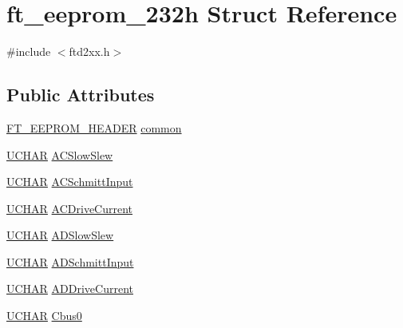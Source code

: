 \hypertarget{structft__eeprom__232h}{}\section{ft\+\_\+eeprom\+\_\+232h Struct Reference}
\label{structft__eeprom__232h}


{\ttfamily \#include $<$ftd2xx.\+h$>$}

\subsection*{Public Attributes}
\begin{DoxyCompactItemize}
\item 
\hyperlink{LALUsbMLx64_2include_2ftd2xx_8h_ad5a6f519cd67a403fd8742756462394e}{F\+T\+\_\+\+E\+E\+P\+R\+O\+M\+\_\+\+H\+E\+A\+D\+ER} \hyperlink{structft__eeprom__232h_a37234d2dd02343759c92fd97e4835ccb}{common}
\item 
\hyperlink{CatCaloProto40MHz_2inc_2WinTypes_8h_a4f4bb67531a9bf6f0b9c6ad76aeba587}{U\+C\+H\+AR} \hyperlink{structft__eeprom__232h_a3cfbbe62de0029839534fb469a9b50c9}{A\+C\+Slow\+Slew}
\item 
\hyperlink{CatCaloProto40MHz_2inc_2WinTypes_8h_a4f4bb67531a9bf6f0b9c6ad76aeba587}{U\+C\+H\+AR} \hyperlink{structft__eeprom__232h_a025e35a0ae019370a4ea968f1cc2df2b}{A\+C\+Schmitt\+Input}
\item 
\hyperlink{CatCaloProto40MHz_2inc_2WinTypes_8h_a4f4bb67531a9bf6f0b9c6ad76aeba587}{U\+C\+H\+AR} \hyperlink{structft__eeprom__232h_a8cb3fbf23ced09e59165178aee3f3c57}{A\+C\+Drive\+Current}
\item 
\hyperlink{CatCaloProto40MHz_2inc_2WinTypes_8h_a4f4bb67531a9bf6f0b9c6ad76aeba587}{U\+C\+H\+AR} \hyperlink{structft__eeprom__232h_a192cf979058aac20dbea8840a35f1bae}{A\+D\+Slow\+Slew}
\item 
\hyperlink{CatCaloProto40MHz_2inc_2WinTypes_8h_a4f4bb67531a9bf6f0b9c6ad76aeba587}{U\+C\+H\+AR} \hyperlink{structft__eeprom__232h_a9d6cc1ae3e56bad64ba55a3db9cd845c}{A\+D\+Schmitt\+Input}
\item 
\hyperlink{CatCaloProto40MHz_2inc_2WinTypes_8h_a4f4bb67531a9bf6f0b9c6ad76aeba587}{U\+C\+H\+AR} \hyperlink{structft__eeprom__232h_a6aa2aea692700ed5e98a958819db3944}{A\+D\+Drive\+Current}
\item 
\hyperlink{CatCaloProto40MHz_2inc_2WinTypes_8h_a4f4bb67531a9bf6f0b9c6ad76aeba587}{U\+C\+H\+AR} \hyperlink{structft__eeprom__232h_aac7c9328aa4b74813b1fbd73a0a6afbd}{Cbus0}
\item 

\end{DoxyCompactItemize}
